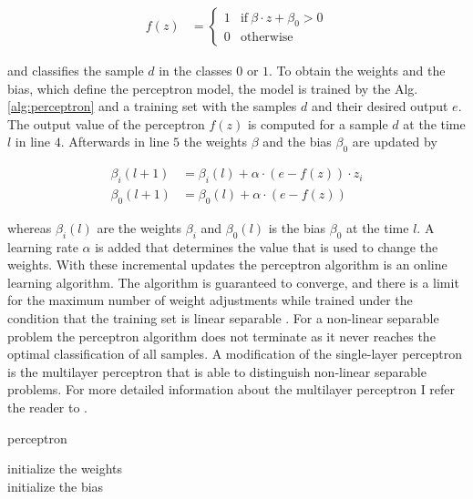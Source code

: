 \begin{align*}
f(z) &= \begin{cases}
1 & \text{if}\ \beta \cdot z + \beta_0 > 0\\
0 & \text{otherwise}
\end{cases}
\end{align*}

and classifies the sample $d$ in the classes $0$ or $1$.
To obtain the weights and the bias, which define the perceptron model, the model is trained by the Alg. \ref{alg:perceptron} and a training set with the samples $d$ and their desired output $e$.
The output value of the perceptron $f(z)$ is computed for a sample $d$ at the time $l$ in line $4$.
Afterwards in line $5$ the weights $\beta$ and the bias $\beta_0$ are updated by

\begin{align*}
\beta_i(l+1) &= \beta_i(l) + \alpha \cdot (e - f(z)) \cdot z_i\\
\beta_0(l+1) &= \beta_0(l) + \alpha \cdot (e - f(z))
\end{align*}

whereas $\beta_i(l)$ are the weights $\beta_i$ and $\beta_0(l)$ is the bias $\beta_0$ at the time $l$.
A learning rate $\alpha$ is added that determines the value that is used to change the weights.
With these incremental updates the perceptron algorithm is an online learning algorithm.
The algorithm is guaranteed to converge, and there is a limit for the maximum number of weight adjustments while trained under the condition that the training set is linear separable \cite{2016Perceptron}.
For a non-linear separable problem the perceptron algorithm does not terminate as it never reaches the optimal classification of all samples. %
A modification of the single-layer perceptron is the multilayer perceptron that is able to distinguish non-linear separable problems.
For more detailed information about the multilayer perceptron I refer the reader to \cite{2017MultilayerPerceptron}.

\SetAlCapHSkip{0.2em}
\begin{algorithm}[H]
\Indm
\SetAlgoLined
\caption{perceptron}
\label{alg:perceptron}
\Indp

initialize the weights\\ %
initialize the bias\\ %

\end{algorithm}

